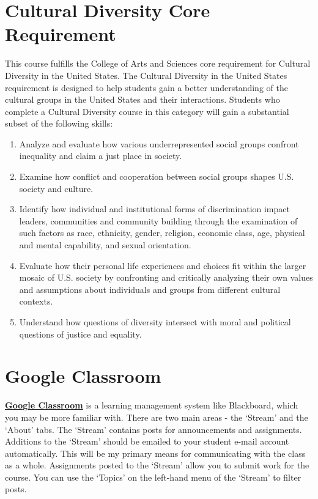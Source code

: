 \documentclass{tufte-book}
\begin{document}
\section{Cultural Diversity Core Requirement}
This course fulfills the College of Arts and Sciences core requirement for Cultural Diversity in the United States. The Cultural Diversity in the United States requirement is designed to help students gain a better understanding of the cultural groups in the United States and their interactions. Students who complete a Cultural Diversity course in this category will gain a substantial subset of the following skills:
\begin{enumerate}[leftmargin=!,labelindent=5pt]
\itemsep-.25em
\item Analyze and evaluate how various underrepresented social groups confront inequality and claim a just place in society.
\item Examine how conflict and cooperation between social groups shapes U.S. society and culture.
\item Identify how individual and institutional forms of discrimination impact leaders, communities and community building through the examination of such factors as race, ethnicity, gender, religion, economic class, age, physical and mental capability, and sexual orientation.
\item Evaluate how their personal life experiences and choices fit within the larger mosaic of U.S. society by confronting and critically analyzing their own values and assumptions about individuals and groups from different cultural contexts.
\item Understand how questions of diversity intersect with moral and political questions of justice and equality.
\end{enumerate}

\vspace{3mm}
\section{Google Classroom}
\textbf{\href{https://classroom.google.com}{Google Classroom}} is a learning management system like Blackboard, which you may be more familiar with. There are two main areas - the `Stream' and the `About' tabs. The `Stream' contains posts for announcements and assignments. Additions to the `Stream' should be emailed to your student e-mail account automatically. This will be my primary means for communicating with the class as a whole. Assignments posted to the `Stream' allow you to submit work for the course. You can use the `Topics' on the left-hand menu of the `Stream' to filter posts.
\end{document}
